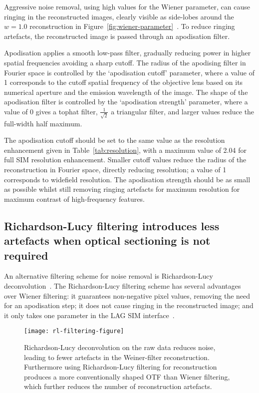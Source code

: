 Aggressive noise removal, using high values for the Wiener parameter, can cause ringing in the reconstructed images, clearly visible as side-lobes around the $w=1.0$ reconstruction in Figure~\ref{fig:wiener-parameter}~\cite{righolt2013image}. 
To reduce ringing artefacts, the reconstructed image is passed through an apodisation filter. 

Apodisation applies a smooth low-pass filter, gradually reducing power in higher spatial frequencies avoiding a sharp cutoff. 
The radius of the apodising filter in Fourier space is controlled by the `apodisation cutoff' parameter, where a value of 1 corresponds to the cutoff spatial frequency of the objective lens based on its numerical aperture and the emission wavelength of the image. 
The shape of the apodisation filter is controlled by the `apodisation strength' parameter, where a value of 0 gives a tophat filter, $\frac{1}{\sqrt{2}}$ a triangular filter, and larger values reduce the full-width half maximum. %

The apodisation cutoff should be set to the same value as the resolution enhancement given in Table~\ref{tab:resolution}, with a maximum value of 2.04 for full SIM resolution enhancement. 
Smaller cutoff values reduce the radius of the reconstruction in Fourier space, directly reducing resolution; a value of 1 corresponds to widefield resolution. 
The apodisation strength should be as small as possible whilst still removing ringing artefacts for maximum resolution for maximum contrast of high-frequency features.  

\subsection{Richardson-Lucy filtering introduces less artefacts when optical sectioning is not required}
An alternative filtering scheme for noise removal is Richardson-Lucy deconvolution~\cite{perez2016optimal}. 
The Richardson-Lucy filtering scheme has several advantages over Wiener filtering: it guarantees non-negative pixel values, removing the need for an apodisation step; it does not cause ringing in the reconstructed image; and it only takes one parameter in the LAG SIM interface~\cite{eichstadt2013comparison, perez2016optimal}.

\begin{figure}[p]
\centering
\texttt{[image: rl-filtering-figure]}
\caption[LAG SIM: Richardson-Lucy filtering can further reduce SIM reconstruction artefacts]{Richardson-Lucy deconvolution on the raw data reduces noise, leading to fewer artefacts in the Weiner-filter reconstruction. Furthermore using Richardson-Lucy filtering for reconstruction produces a more conventionally shaped OTF than Wiener filtering, which further reduces the number of reconstruction artefacts.}
\label{fig:rl-filtering}
\end{figure}

